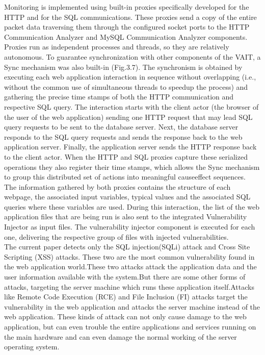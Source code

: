 \newline
Monitoring is implemented using built-in proxies specifically developed for the HTTP and for the SQL communications. These proxies send a copy of the entire packet data
traversing them through the configured socket ports to the
HTTP Communication Analyzer and MySQL Communication
Analyzer components. Proxies run as independent processes
and threads, so they are relatively autonomous. To guarantee synchronization with other components of the VAIT, a
Sync mechanism was also built-in (Fig.3.7). The synchronism
is obtained by executing each web application interaction in
sequence without overlapping (i.e., without the common
use of simultaneous threads to speedup the process) and
gathering the precise time stamps of both the HTTP communication and respective SQL query. The interaction starts with the client actor (the browser of
the user of the web application) sending one HTTP request
that may lead SQL query requests to be sent to the database
server. Next, the database server responds to the SQL query
requests and sends the response back to the web application
server. Finally, the application server sends the HTTP
response back to the client actor. When the HTTP and SQL
proxies capture these serialized operations they also register
their time stamps, which allows the Sync mechanism to
group this distributed set of actions into meaningful causeeffect sequences.\\
\newline
The information gathered by both proxies contains the
structure of each webpage, the associated input variables, typical values and the associated SQL queries
where these variables are used. During this interaction,
the list of the web application files that are being run is
also sent to the integrated Vulnerability Injector as input
files. The vulnerability injector component is executed for each one, delivering the respective group of files with
injected vulnerabilities.\\
\newline
The current paper detects only the SQL injection(SQLi) attack and Cross Site Scripting (XSS) attacks. These two are the most common vulnerability found in the web application world.These two attacks attack the application data and the user information available with the system.But there are some other forms of attacks, targeting the server machine which runs these application itself.Attacks like Remote Code Execution (RCE) and File Inclusion (FI) attacks target the vulnerability in the web application and attacks the server machine instead of the web application. These kinds of attack can not only cause damage to the web application, but can even trouble the entire applications and services running on the main hardware and can even damage the normal working of the server operating system.\\
